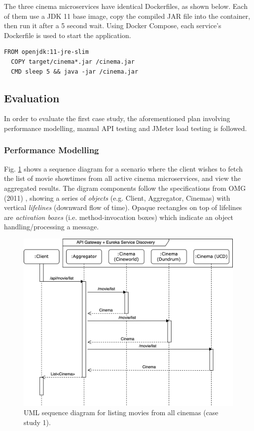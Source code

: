 The three cinema microservices have identical Dockerfiles, as shown below. Each of them use a JDK 11 base image, copy the compiled JAR file into the container, then run it after a 5 second wait. Using Docker Compose, each service's Dockerfile is used to start the application.

\begin{lstlisting}[caption=Dockerfile for cinema services]
  FROM openjdk:11-jre-slim
  COPY target/cinema*.jar /cinema.jar
  CMD sleep 5 && java -jar /cinema.jar
\end{lstlisting}


\subsection{Evaluation}

In order to evaluate the first case study, the aforementioned plan involving performance modelling, manual API testing and JMeter load testing is followed.

\subsubsection{Performance Modelling}

Fig. \ref{fig:cs01-sequence} shows a sequence diagram for a scenario where the client wishes to fetch the list of movie showtimes from all active cinema microservices, and view the aggregated results. The digram components follow the specifications from OMG (2011) \cite{omg11}, showing a series of \textit{objects} (e.g. Client, Aggregator, Cinemas) with vertical \textit{lifelines} (downward flow of time). Opaque rectangles on top of lifelines are \textit{activation boxes} (i.e. method-invocation boxes) which indicate an object handling/processing a message.

\begin{figure}[H]
  \centering
  \includegraphics[width=0.75\linewidth]{./assets/diagrams/cs01-sequence.png}
  \caption{UML sequence diagram for listing movies from all cinemas (case study 1).}
  \label{fig:cs01-sequence}
\end{figure}

